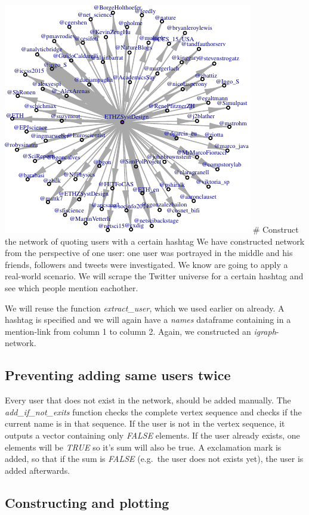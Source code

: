 \documentclass[]{article}
\begin{document}
\includegraphics{ETH_Twitter_files/figure-latex/unnamed-chunk-6-1.pdf}
\# Construct the network of quoting users with a certain hashtag We have
constructed network from the perspective of one user: one user was
portrayed in the middle and his friends, followers and tweets were
investigated. We know are going to apply a real-world scenario. We will
scrape the Twitter universe for a certain hashtag and see which people
mention eachother.

We will reuse the function \emph{extract\_user}, which we used earlier
on already. A hashtag is specified and we will again have a \emph{names}
dataframe containing in a mention-link from column 1 to column 2. Again,
we constructed an \emph{igraph}-network.

\subsection{Preventing adding same users
twice}\label{preventing-adding-same-users-twice}

Every user that does not exist in the network, should be added manually.
The \emph{add\_if\_not\_exits} function checks the complete vertex
sequence and checks if the current name is in that sequence. If the user
is not in the vertex sequence, it outputs a vector containing only
\emph{FALSE} elements. If the user already exists, one elements will be
\emph{TRUE} so it's sum will also be true. A exclamation mark is added,
so that if the sum is \emph{FALSE} (e.g.~the user does not exists yet),
the user is added afterwards.

\subsection{Constructing and plotting}\label{constructing-and-plotting}
\end{document}
